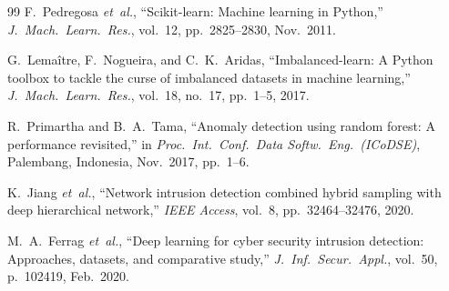 \documentclass[conference]{IEEEtran}
\begin{document}
\begin{thebibliography}{99}
F.~Pedregosa \textit{et~al.},
``Scikit-learn: Machine learning in Python,''
\textit{J.\ Mach.\ Learn.\ Res.}, vol.~12, pp.~2825--2830, Nov.\ 2011.

G.~Lema\^{i}tre, F.~Nogueira, and C.~K.~Aridas,
``Imbalanced-learn: A Python toolbox to tackle the curse of imbalanced
datasets in machine learning,''
\textit{J.\ Mach.\ Learn.\ Res.}, vol.~18, no.~17, pp.~1--5, 2017.

R.~Primartha and B.~A.~Tama,
``Anomaly detection using random forest: A performance revisited,''
in \textit{Proc.\ Int.\ Conf.\ Data Softw.\ Eng.\ (ICoDSE)},
Palembang, Indonesia, Nov.\ 2017, pp.~1--6.

K.~Jiang \textit{et~al.},
``Network intrusion detection combined hybrid sampling with deep hierarchical
network,''
\textit{IEEE Access}, vol.~8, pp.~32464--32476, 2020.

M.~A.~Ferrag \textit{et~al.},
``Deep learning for cyber security intrusion detection: Approaches, datasets,
and comparative study,''
\textit{J.\ Inf.\ Secur.\ Appl.}, vol.~50, p.~102419, Feb.\ 2020.

\end{thebibliography}
\end{document}
